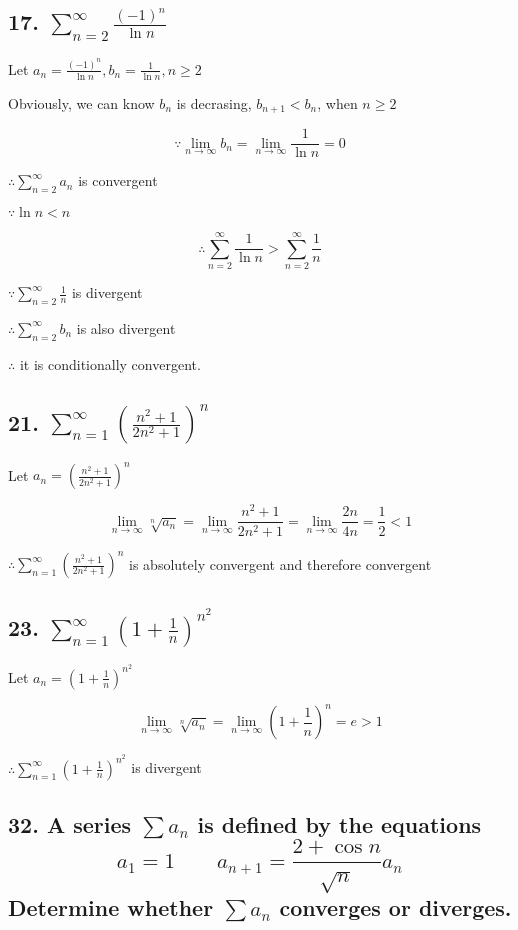 \documentclass{article}
\begin{document}
    \subsection*{17. $\sum_{n=2}^\infty \frac{(-1)^n}{\ln n}$}

    Let $a_n = \frac{(-1)^n}{\ln n}, b_n = \frac{1}{\ln n}, n \geq 2$

    Obviously, we can know $b_n$ is decrasing, $b_{n+1} < b_n$, when $n \geq 2$

    $$\because \lim_{n\to\infty}b_n = \lim_{n\to\infty}\frac{1}{\ln n} = 0$$

    $\therefore \sum_{n=2}^\infty a_n$ is convergent

    $\because \ln n < n$

    $$\therefore \sum_{n=2}^\infty \frac{1}{\ln n} > \sum_{n=2}^\infty \frac{1}{n}$$

    $\because \sum_{n=2}^\infty \frac 1 n$ is divergent

    $\therefore \sum_{n=2}^\infty b_n$ is also divergent

    $\therefore $ it is conditionally convergent.

    \subsection*{21. $\sum_{n=1}^\infty (\frac{n^2+1}{2n^2+1})^n$}

    Let $a_n = (\frac{n^2+1}{2n^2+1})^n$

    $$\lim_{n\to\infty}\sqrt[n]{a_n} = \lim_{n\to\infty}\frac{n^2+1}{2n^2+1} = \lim_{n\to\infty}\frac{2n}{4n} = \frac 1 2 < 1$$

    $\therefore \sum_{n=1}^\infty (\frac{n^2+1}{2n^2+1})^n$ is absolutely convergent and therefore convergent

    \subsection*{23. $\sum_{n=1}^\infty (1 + \frac{1}{n})^{n^2}$}

    Let $a_n = (1 + \frac{1}{n})^{n^2}$

    $$\lim_{n\to\infty}\sqrt[n]{a_n} = \lim_{n\to\infty}(1 + \frac 1 n)^n = e > 1$$

    $\therefore \sum_{n=1}^\infty (1+\frac 1 n)^{n^2}$ is divergent

    \subsection*{32. A series $\sum a_n$ is defined by the equations $$a_1 = 1 \qquad a_{n+1} = \frac{2 + \cos n}{\sqrt n}a_n$$Determine whether $\sum a_n$ converges or diverges.}
\end{document}
